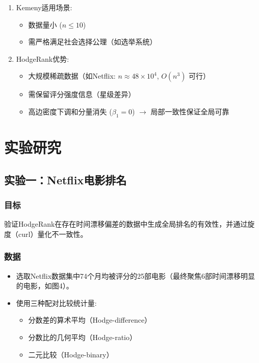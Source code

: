 \documentclass[a4paper]{article}
\begin{document}
\begin{enumerate}
    \item Kemeny适用场景:
    \begin{itemize}
        \item 数据量小 ($n \leq 10$)
        \item 需严格满足社会选择公理（如选举系统）
    \end{itemize}
    
    \item HodgeRank优势:
    \begin{itemize}
        \item 大规模稀疏数据（如Netflix: $n \approx 48 \times 10^4$, $O(n^3)$ 可行）
        \item 需保留评分强度信息（星级差异）
        \item 高边密度下调和分量消失 ($\beta_1 = 0$) $\rightarrow$ 局部一致性保证全局可靠
    \end{itemize}
\end{enumerate}

\section{实验研究}
\subsection{实验一：Netflix电影排名}

\subsubsection*{目标}

验证HodgeRank在存在时间漂移偏差的数据中生成全局排名的有效性，并通过旋度（curl）量化不一致性。

\subsubsection*{数据}

\begin{itemize}
    \item 选取Netflix数据集中74个月均被评分的25部电影（最终聚焦6部时间漂移明显的电影，如图4）。
    \item 使用三种配对比较统计量:
    \begin{itemize}
        \item 分数差的算术平均（Hodge-difference）
        \item 分数比的几何平均（Hodge-ratio）
        \item 二元比较（Hodge-binary）
    \end{itemize}
\end{itemize}
\end{document}
